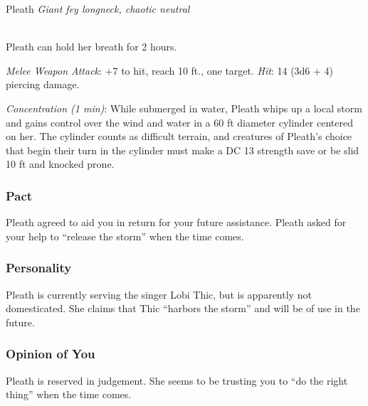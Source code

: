 \documentclass[letterpaper,10pt,twoside,twocolumn,openany]{book}
\begin{document}
\begin{monsterbox}{ Pleath}
	\textit{Giant fey longneck, chaotic neutral}\\
	\hline%
	\basics[%
	armorclass = 13 (natural armor),
	hitpoints  = \dice{8d10 + 24},
	speed      = {10 ft., swim 40 ft.}
	]
	\hline%
	\stats[
    STR = \stat{18}, %
    DEX = \stat{15},
    CON = \stat{16},
    INT = \stat{9},
    WIS = \stat{12},
    CHA = \stat{5}
	]
	\hline%
	\details[%
	skills = {Perception + 3, Stealth +5 (when underwater)},
	senses = {pp 13},
	languages = {Longneck, understands Common and Sylvan but cannot speak},
	challenge = 2
	]
	\hline \\[1mm]
	\begin{monsteraction}
		Pleath can hold her breath for 2 hours.
	\end{monsteraction}
	
	\begin{monsteraction}[Bite]
		\emph{Melee Weapon Attack}: +7 to hit, reach 10 ft., one target. \emph{Hit}: 14 (3d6 + 4) piercing damage.
	\end{monsteraction}
	
	\begin{monsteraction}
		\emph{Concentration (1 min)}: While submerged in water, Pleath whips up a local storm and gains control over the wind and water in a 60 ft diameter cylinder centered on her. The cylinder counts as difficult terrain, and creatures of Pleath's choice that begin their turn in the cylinder must make a DC 13 strength save or be slid 10 ft and knocked prone.
	\end{monsteraction}

\end{monsterbox}

\subsubsection{Pact}
Pleath agreed to aid you in return for your future assistance.
Pleath asked for your help to ``release the storm'' when the time comes. 

\subsubsection{Personality}
Pleath is currently serving the singer Lobi Thic, but is apparently not domesticated. 
She claims that Thic ``harbors the storm'' and will be of use in the future.

\subsubsection{Opinion of You}
Pleath is reserved in judgement. 
She seems to be trusting you to ``do the right thing'' when the time comes. 



\end{document}

